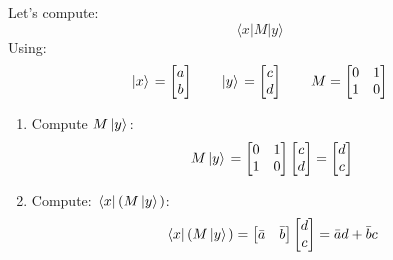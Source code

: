 \begin{itemize}
    \begin{examplebox}
        Let's compute:
        \begin{equation*}
            \langle x | M | y \rangle
        \end{equation*}
        Using:
        \begin{equation*}
            \left| x \rangle\right. =
            \begin{bmatrix} a \\ b \end{bmatrix} \hspace{2em}
            \left| y \rangle\right. =
            \begin{bmatrix} c \\ d \end{bmatrix} \hspace{2em}
            M =
            \begin{bmatrix} 0 & 1 \\ 1 & 0 \end{bmatrix}
        \end{equation*}
        \begin{enumerate}
            \item Compute $M \left| y \rangle\right.$:
            \begin{equation*}
                M \left| y \rangle\right. =
                \begin{bmatrix} 0 & 1 \\ 1 & 0 \end{bmatrix}
                \begin{bmatrix} c \\ d \end{bmatrix}
                =
                \begin{bmatrix} d \\ c \end{bmatrix}
            \end{equation*}

            \item Compute: $\left.\langle x \right| \left(M \left| y \rangle\right.\right)$:
            \begin{equation*}
                \left.\langle x \right| \left(M \left| y \rangle\right.\right) =
                \begin{bmatrix} \bar{a} & \bar{b} \end{bmatrix}
                \begin{bmatrix} d \\ c \end{bmatrix}
                =
                \bar{a}d + \bar{b}c
            \end{equation*}
        \end{enumerate}
    \end{examplebox}
\end{itemize}